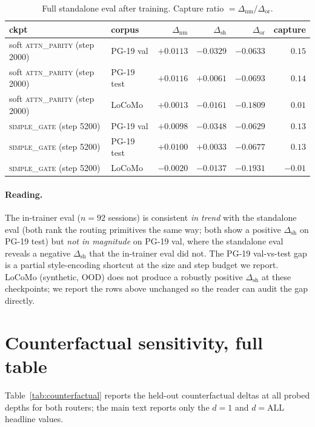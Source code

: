 \documentclass{article}
\newcommand{\dnm}{\Delta_{\text{nm}}}
\newcommand{\dsh}{\Delta_{\text{sh}}}
\newcommand{\dor}{\Delta_{\text{or}}}
\begin{document}
\begin{table}[h]
\centering
\caption{Full standalone eval after training.  Capture ratio
$=\dnm/\dor$.}
\label{tab:standalone-full}
\small
\begin{tabular}{llrrrr}
\toprule
ckpt & corpus & $\dnm$ & $\dsh$ & $\dor$ & capture \\
\midrule
soft \textsc{attn\_parity} (step 2000) & PG-19 val  & $+0.0113$ & $-0.0329$ & $-0.0633$ & $0.15$ \\
soft \textsc{attn\_parity} (step 2000) & PG-19 test & $+0.0116$ & $+0.0061$ & $-0.0693$ & $0.14$ \\
soft \textsc{attn\_parity} (step 2000) & LoCoMo     & $+0.0013$ & $-0.0161$ & $-0.1809$ & $0.01$ \\
\midrule
\textsc{simple\_gate} (step 5200)      & PG-19 val  & $+0.0098$ & $-0.0348$ & $-0.0629$ & $0.13$ \\
\textsc{simple\_gate} (step 5200)      & PG-19 test & $+0.0100$ & $+0.0033$ & $-0.0677$ & $0.13$ \\
\textsc{simple\_gate} (step 5200)      & LoCoMo     & $-0.0020$ & $-0.0137$ & $-0.1931$ & $-0.01$ \\
\bottomrule
\end{tabular}
\end{table}

\paragraph{Reading.}
The in-trainer eval ($n=92$ sessions) is consistent \emph{in trend}
with the standalone eval (both rank the routing primitives the same
way; both show a positive $\dsh$ on PG-19 test) but \emph{not in
magnitude} on PG-19 val, where the standalone eval reveals a negative
$\dsh$ that the in-trainer eval did not.  The PG-19 val-vs-test gap
is a partial style-encoding shortcut at the size and step budget we
report.  LoCoMo (synthetic, OOD) does not produce a robustly positive
$\dsh$ at these checkpoints; we report the rows above unchanged so
the reader can audit the gap directly.

\section{Counterfactual sensitivity, full table}
\label{app:cf}

Table~\ref{tab:counterfactual} reports the held-out counterfactual
deltas at all probed depths for both routers; the main text reports
only the $d{=}1$ and $d{=}\mathrm{ALL}$ headline values.
\end{document}
